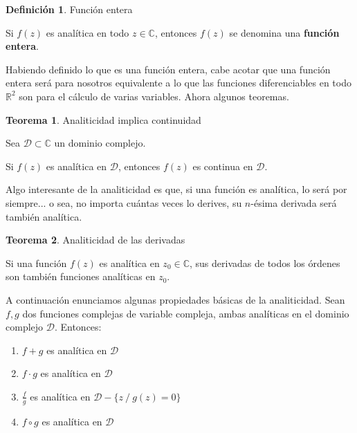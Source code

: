 \documentclass[12pt]{article}
\theoremstyle{definition}
\newtheorem{definition}{Definici\'on}[section]
\theoremstyle{theorem}
\newtheorem{theorem}{Teorema}[section]
\theoremstyle{corolary}
\begin{document}
\colorbox{blue!40!white!80}{\parbox{\linewidth}{
 \theoremstyle{definition}
 \begin{definition}{Funci\'on entera}

  	Si $f(z)$ es anal\'itica en todo $z \in \mathbb{C}$, entonces $f(z)$ se denomina una \textbf{funci\'on entera}.
 \end{definition}}}
\linebreak
\linebreak

Habiendo definido lo que es una funci\'on entera, cabe acotar que una funci\'on entera ser\'a para nosotros equivalente a lo que las funciones diferenciables en todo $\mathbb{R}^2$ son para el c\'alculo de varias variables. Ahora algunos teoremas.\\

\colorbox{blue!40!white!80}{\parbox{\linewidth}{
\theoremstyle{theorem}
\begin{theorem} {Analiticidad implica continuidad}

Sea $\mathcal{D}\subset \mathbb{C}$ un dominio complejo.

Si $f(z)$ es anal\'itica en $\mathcal{D}$, entonces $f(z)$ es continua en $\mathcal{D}$.

\end{theorem}}}
\linebreak
\linebreak

Algo interesante de la analiticidad es que, si una funci\'on es anal\'itica, lo ser\'a por siempre... o sea, no importa cu\'antas veces lo derives, su $n$-\'esima derivada ser\'a tambi\'en anal\'itica.\\

\colorbox{blue!40!white!80}{\parbox{\linewidth}{
\theoremstyle{theorem}
\begin{theorem} {Analiticidad de las derivadas}

Si una funci\'on $f(z)$ es anal\'itica en $z_0 \in \mathbb{C}$, sus derivadas de todos los \'ordenes son tambi\'en funciones anal\'iticas en $z_0$.

\end{theorem}}}
\linebreak
\linebreak

A continuaci\'on enunciamos algunas propiedades b\'asicas de la analiticidad. Sean $f, g$ dos funciones complejas de variable compleja, ambas anal\'iticas en el dominio complejo $\mathcal{D}$. Entonces: 
\begin{enumerate}
	\item $f + g$ es anal\'itica en $\mathcal{D}$
	\item $f \cdot g$ es anal\'itica en $\mathcal{D}$
	\item \mbox{\Large$\frac{f}{g}$} es anal\'itica en $\mathcal{D} - \{ z\: / \: g(z)=0\}$
	\item $f \circ g$ es anal\'itica en $\mathcal{D}$
\end{enumerate}
\end{document}
